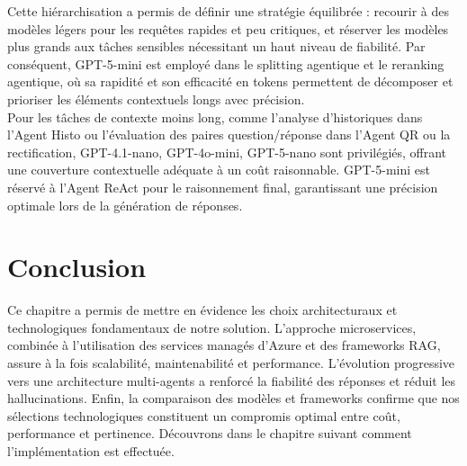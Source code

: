 \begin{table}[H]
\centering
\caption{Comparaison synthétique des modèles de langage testés (prix par 1M tokens) \cite{openai-pricing}}
\end{table}

Cette hiérarchisation a permis de définir une stratégie équilibrée : recourir à des modèles légers pour les requêtes rapides et peu critiques, et réserver les modèles plus grands aux tâches sensibles nécessitant un haut niveau de fiabilité.
Par conséquent, GPT-5-mini est employé dans le splitting agentique et le reranking agentique, où sa rapidité et son efficacité en tokens permettent de décomposer et prioriser les éléments contextuels longs avec précision.\\
Pour les tâches de contexte moins long, comme l’analyse d’historiques dans l’Agent Histo ou l’évaluation des paires question/réponse dans l’Agent QR ou la rectification, GPT-4.1-nano, GPT-4o-mini, GPT-5-nano sont privilégiés, offrant une couverture contextuelle adéquate à un coût raisonnable. GPT-5-mini est réservé à l’Agent ReAct pour le raisonnement final, garantissant une précision optimale lors de la génération de réponses.

\section{Conclusion}
Ce chapitre a permis de mettre en évidence les choix architecturaux et technologiques fondamentaux de notre solution. L’approche microservices, combinée à l’utilisation des services managés d’Azure et des frameworks RAG, assure à la fois scalabilité, maintenabilité et performance. L’évolution progressive vers une architecture multi-agents a renforcé la fiabilité des réponses et réduit les hallucinations. Enfin, la comparaison des modèles et frameworks confirme que nos sélections technologiques constituent un compromis optimal entre coût, performance et pertinence. Découvrons dans le chapitre suivant comment l'implémentation est effectuée.
